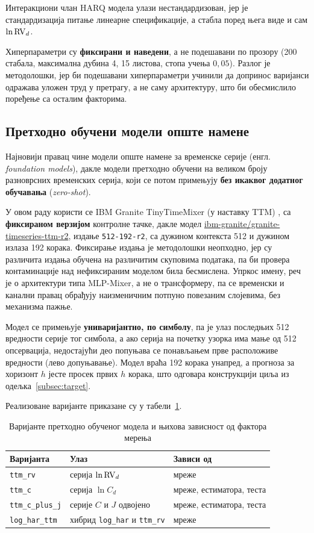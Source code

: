 Интеракциони члан HARQ модела улази нестандардизован, јер је стандардизација питање
линеарне спецификације, а стабла поред њега виде и сам $\ln\mathrm{RV}_d$.

Хиперпараметри су \textbf{фиксирани и наведени}, а не подешавани по прозору (200
стабала, максимална дубина 4, 15 листова, стопа учења $0{,}05$). Разлог је
методолошки, јер би подешавани хиперпараметри учинили да допринос варијанси одражава
уложен труд у претрагу, а не саму архитектуру, што би обесмислило поређење са осталим
факторима.

\subsection{Претходно обучени модели опште намене}
\label{subsec:ttm}

Најновији правац чине модели опште намене за временске серије (енгл.
\textit{foundation models}), дакле модели претходно обучени на великом броју разноврсних
временских серија, који се потом примењују \textbf{без икаквог додатног обучавања}
(\textit{zero-shot}).

У овом раду користи се IBM Granite TinyTimeMixer (у наставку TTM)
\parencite{ekambaram2024}, са
\textbf{фиксираном верзијом} контролне тачке, дакле модел
\url{ibm-granite/granite-timeseries-ttm-r2}, издање \texttt{512-192-r2}, са дужином
контекста 512 и дужином излаза 192 корака. Фиксирање издања је методолошки неопходно, јер су различита издања обучена
на различитим скуповима података, па би провера контаминације над нефиксираним
моделом била бесмислена. Упркос имену, реч је о архитектури типа MLP-Mixer, а не о
трансформеру, па се временски и канални правац обрађују наизменичним потпуно повезаним
слојевима, без механизма пажње.

Модел се примењује \textbf{униваријантно, по симболу}, па је улаз последњих 512
вредности серије тог симбола, а ако серија на почетку узорка има мање од 512
опсервација, недостајући део попуњава се понављањем прве расположиве вредности (лево
допуњавање). Модел враћа 192 корака унапред, а прогноза за хоризонт $h$ јесте просек
првих $h$ корака, што одговара конструкцији циља из одељка~\ref{subsec:target}.

Реализоване варијанте приказане су у табели~\ref{tab:ttm}.

\begin{table}[htbp]
\centering
\caption{Варијанте претходно обученог модела и њихова зависност од фактора мерења}
\label{tab:ttm}
\begin{tabular}{lll}
\toprule
Варијанта & Улаз & Зависи од \\
\midrule
\texttt{ttm\_rv}        & серија $\ln \mathrm{RV}_d$        & мреже \\
\texttt{ttm\_c}         & серија $\ln C_d$          & мреже, естиматора, теста \\
\texttt{ttm\_c\_plus\_j} & серије $C$ и $J$ одвојено & мреже, естиматора, теста \\
\texttt{log\_har\_ttm}  & хибрид \texttt{log\_har} и \texttt{ttm\_rv} & мреже \\
\bottomrule
\end{tabular}
\end{table}

